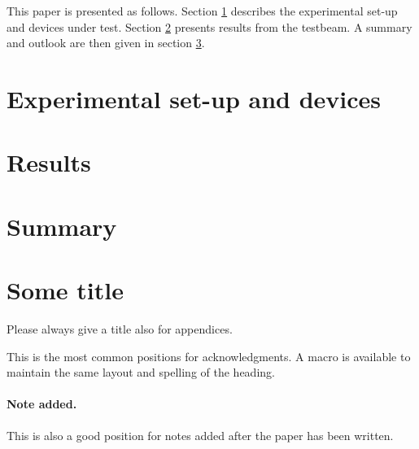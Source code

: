 \documentclass[a4paper,11pt]{article}
\begin{document}
This paper is presented as follows. Section \ref{sec:setup} describes the experimental set-up and devices under test. Section \ref{sec:results} presents results from the testbeam. A summary and outlook are then given in section \ref{sec:summary}.

\section{Experimental set-up and devices}
\label{sec:setup}

\section{Results}
\label{sec:results}

\section{Summary}
\label{sec:summary}

\appendix
\section{Some title}
Please always give a title also for appendices.





\acknowledgments

This is the most common positions for acknowledgments. A macro is
available to maintain the same layout and spelling of the heading.

\paragraph{Note added.} This is also a good position for notes added
after the paper has been written.





\end{document}
